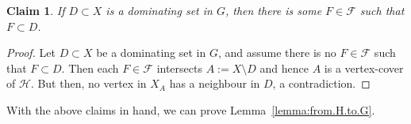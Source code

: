 \documentclass[reqno, 12pt]{amsart}
\numberwithin{equation}{section}
\numberwithin{figure}{section}
\newtheorem{claim}[theorem]{Claim}
\newcommand{\calH}{\mathcal{H}}
\newcommand{\calF}{\mathcal{F}}
\begin{document}
\begin{claim}\label{clm:transference.claim3}
If $D\subset X$ is a dominating set in $G$, then there is some $F\in\mathcal{F}$ such that $F\subset D$.
\end{claim}

\begin{proof}
Let $D\subset X$ be a dominating set in $G$, and assume there is no $F\in\mathcal{F}$ such that $F\subset D$. Then each $F\in \calF$ intersects $A:=X\setminus D$
and hence $A$ is a vertex-cover of $\calH$. But then, no vertex in $X_A$ has a neighbour in $D$, a contradiction.
\end{proof}

With the above claims in hand, we can prove
Lemma~\ref{lemma:from.H.to.G}.

\smallskip
\end{document}
